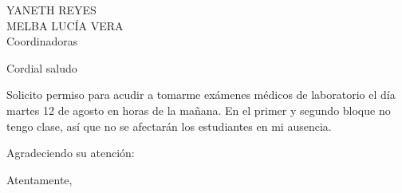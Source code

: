 \documentclass[letterpaper,11pt]{letter}
\date{11 de agosto de 2014}
\begin{document}

\begin{letter}{YANETH REYES\\MELBA LUCÍA VERA\\Coordinadoras}
\address{Colegio Arborizadora Baja I.E.D.}

\opening{Cordial saludo}
Solicito permiso para acudir a tomarme exámenes médicos de laboratorio el día martes 12 de agosto en horas de la mañana. En el primer y segundo bloque no tengo clase, así que no se afectarán los estudiantes en mi ausencia.

Agradeciendo su atención:

\signature{Germán Avendaño Ramírez\\C.C. 79003541 de Guaduas\\Lic. en Mat U.D., M. Sc. U.N.\\Profesor de Matemáticas\\Colegio Arborizadora Baja I.E.D.}

\closing{Atentamente,}


\end{letter}
\end{document}
